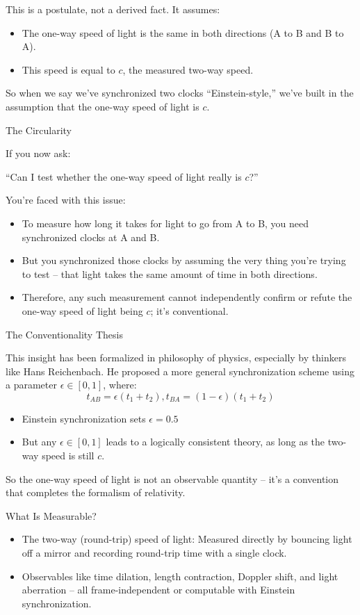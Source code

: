 \documentclass[a4paper]{article}
\theoremstyle{plain}
\theoremstyle{definition}
\begin{document}
This is a postulate, not a derived fact.  It assumes:
\begin{itemize}
\item The one-way speed of light is the same in both directions (A to
  B and B to A).
\item This speed is equal to $c$, the measured two-way speed.
\end{itemize}

So when we say we've synchronized two clocks ``Einstein-style,'' we've
built in the assumption that the one-way speed of light is $c$.

The Circularity

If you now ask:

``Can I test whether the one-way speed of light really is $c$?''

You're faced with this issue:
\begin{itemize}
\item To measure how long it takes for light to go from A to B, you
  need synchronized clocks at A and B.
\item But you synchronized those clocks by assuming the very thing
  you're trying to test -- that light takes the same amount of time in
  both directions.
\item Therefore, any such measurement cannot independently confirm or
  refute the one-way speed of light being $c$; it's conventional.
\end{itemize}

The Conventionality Thesis

This insight has been formalized in philosophy of physics, especially
by thinkers like Hans Reichenbach. He proposed a more general
synchronization scheme using a parameter $\epsilon \in [0,1]$, where:
\begin{equation}
t_{AB} = \epsilon(t_1 + t_2), t_{BA} = (1-\epsilon)(t_1 + t_2)
\end{equation}
\begin{itemize}
\item Einstein synchronization sets $\epsilon = 0.5$
\item But any $\epsilon \in [0,1]$ leads to a logically consistent
  theory, as long as the two-way speed is still $c$.
\end{itemize}
So the one-way speed of light is not an observable quantity -- it's a
convention that completes the formalism of relativity.

What Is Measurable?
\begin{itemize}
\item The two-way (round-trip) speed of light: Measured directly by
  bouncing light off a mirror and recording round-trip time with a
  single clock.
\item Observables like time dilation, length contraction, Doppler
  shift, and light aberration -- all frame-independent or computable
  with Einstein synchronization.
\end{itemize}
\end{document}
